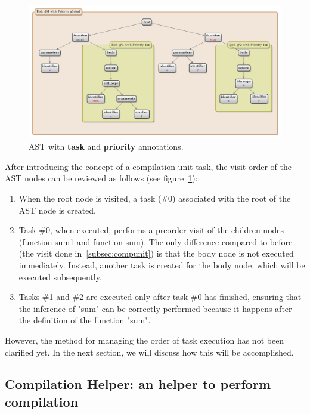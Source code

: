 \begin{figure}[t]
    \centering
    \includegraphics[width=0.9\linewidth]{figs/concept/simple_ast_annotated.pdf}
    \caption{AST with \textbf{task} and \textbf{priority} annotations.}
    \label{lst:concept:ast_sum_annotated}
\end{figure}

After introducing the concept of a compilation unit task, the visit order of the AST nodes can be reviewed as follows (see figure~\ref{lst:concept:ast_sum_annotated}):

\begin{enumerate}
    \item When the root node is visited, a task (\#0) associated with the root of the AST node is created.
    \item Task \#0, when executed, performs a preorder visit of the children nodes (function sum1 and function sum). The only difference compared to before (the visit done in~\ref{subsec:compunit}) is that the body node is not executed immediately. Instead, another task is created for the body node, which will be executed subsequently.
    \item Tasks \#1 and \#2 are executed only after task \#0 has finished, ensuring that the inference of "sum" can be correctly performed because it happens after the definition of the function "sum".
\end{enumerate}

However, the method for managing the order of task execution has not been clarified yet. In the next section, we will discuss how this will be accomplished.

\subsection{Compilation Helper: an helper to perform compilation}\label{subsec:concept:CompilationHelperAnHelperToPerformCompilation}

